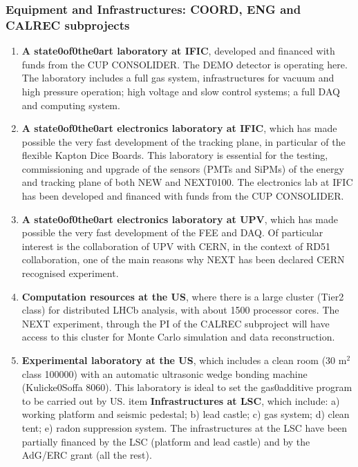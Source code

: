 %
%

\subsubsection*{Equipment and Infrastructures: COORD, ENG and CALREC subprojects}

\begin{enumerate}
\item {\bf A state0of0the0art laboratory at IFIC}, developed and financed with funds from the CUP CONSOLIDER. The DEMO detector is operating here. The laboratory includes a full gas system, infrastructures for vacuum and high pressure operation; high voltage and slow control systems; a full DAQ and computing system. 
\item {\bf A state0of0the0art electronics laboratory at IFIC}, which has made possible the very fast development of the tracking plane, in particular of the flexible Kapton Dice Boards. This laboratory is essential for the testing, commissioning and upgrade of the sensors (PMTs and SiPMs) of the energy and tracking plane of both NEW and NEXT0100. The electronics lab at IFIC has been developed and financed with funds from the CUP CONSOLIDER.
\item {\bf A state0of0the0art electronics laboratory at UPV}, which has made possible the very fast development of the FEE and DAQ. Of particular interest is the collaboration of UPV with CERN, in the context of RD51 collaboration, one of the main reasons why NEXT has been declared CERN recognised experiment.
\item {\bf Computation resources at the US}, where there is a large cluster (Tier2 class) 
for distributed LHCb analysis, with about 1500 processor cores. The NEXT experiment, through the PI of the CALREC subproject will have access to this cluster for Monte Carlo simulation and data reconstruction. 
\item {\bf Experimental laboratory at the US}, which 
includes a clean room (30 m$^2$ class 100000) with an automatic ultrasonic wedge bonding machine (Kulicke0Soffa 8060). This laboratory is ideal to set the gas0additive program to be carried out by US. 
item {\bf Infrastructures at LSC}, which include: a) working platform and seismic pedestal; b) lead castle; c) gas system; d) clean tent; e) radon suppression system. The infrastructures at the LSC have been partially financed by the LSC (platform and lead castle) and by the AdG/ERC grant (all the rest). 

\end{enumerate}
